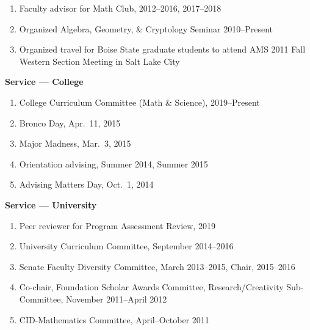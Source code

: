 \documentclass[12pt]{article}
\begin{document}
\begin{enumerate}
\item Faculty advisor for Math Club, 2012--2016, 2017--2018

\item Organized Algebra, Geometry, \& Cryptology Seminar 2010--Present

\item Organized travel for Boise State graduate students to attend AMS 2011 Fall Western Section Meeting in Salt Lake City

\end{enumerate}

\textbf{Service --- College}
\begin{enumerate}
\item College Curriculum Committee (Math \& Science), 2019--Present

\item Bronco Day, Apr.\ 11, 2015
\item Major Madness, Mar.\ 3, 2015
\item Orientation advising, Summer 2014, Summer 2015
\item Advising Matters Day, Oct.\ 1, 2014
\end{enumerate}


\textbf{Service --- University}
\begin{enumerate}
\item Peer reviewer for Program Assessment Review, 2019

\item University Curriculum Committee, September 2014--2016

\item Senate Faculty Diversity Committee, March 2013--2015, Chair, 2015--2016

\item Co-chair, Foundation Scholar Awards Committee, Research/Creativity Sub-Committee, Nov\-ember 2011--April 2012

\item CID-Mathematics Committee, April--October 2011
\end{enumerate}
\end{document}
